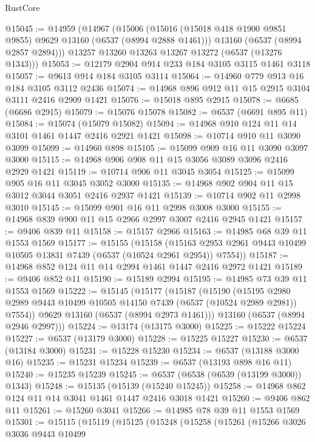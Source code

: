 \begin{lexlean}{RustCore}
\begin{coremodule}
@15045 := @14959
    (@14967
      (@15006
        (@15016 (@15018 @418 @1900 @9851 @9855) @9629 @13160 (@6537 (@8994 @2888 @1461)))
        @13160
        (@6537 (@8994 @2857 @2894)))
      @13257
      @13260
      @13263
      @13267
      @13272
      (@6537 (@13276 @1343)))
@15053 := @12179 @2904 @914 @233 @184 @3105 @3115 @1461 @3118
@15057 := @9613 @914 @184 @3105 @3114
@15064 := @14960 @779 @913 @16 @184 @3105 @3112 @2436
@15074 := @14968 @896 @912 @11 @15 @2915 @3104 @3111 @2416 @2909 @1421
@15076 := @15018 @895 @2915
@15078 := @6685 (@6686 @2915)
@15079 := @15076 @15078
@15082 := @6537 (@6691 @895 @11)
@15084 := @15074 (@15079 @15082)
@15094 := @14968 @910 @124 @11 @14 @3101 @1461 @1447 @2416 @2921 @1421
@15098 := @10714 @910 @11 @3090 @3099
@15099 := @14960 @898
@15105 := @15099 @909 @16 @11 @3090 @3097 @3000
@15115 := @14968 @906 @908 @11 @15 @3056 @3089 @3096 @2416 @2929 @1421
@15119 := @10714 @906 @11 @3045 @3054
@15125 := @15099 @905 @16 @11 @3045 @3052 @3000
@15135 := @14968 @902 @904 @11 @15 @3012 @3044 @3051 @2416 @2937 @1421
@15139 := @10714 @902 @11 @2998 @3010
@15145 := @15099 @901 @16 @11 @2998 @3008 @3000
@15155 := @14968 @839 @900 @11 @15 @2966 @2997 @3007 @2416 @2945 @1421
@15157 := @9406 @839 @11
@15158 := @15157 @2966
@15163 := @14985 @68 @39 @11 @1553 @1569
@15177 := @15155
    (@15158
      (@15163 @2953 @2961 @9443 @10499 @10505 @13831 @7439 (@6537 (@10524 @2961 @2954)) @7554))
@15187 := @14968 @852 @124 @11 @14 @2994 @1461 @1447 @2416 @2972 @1421
@15189 := @9406 @852 @11
@15190 := @15189 @2994
@15195 := @14985 @73 @39 @11 @1553 @1569
@15222 := @15145
    (@15177
      (@15187
        (@15190
          (@15195 @2980 @2989 @9443 @10499 @10505 @14150 @7439 (@6537 (@10524 @2989 @2981)) @7554))
        @9629
        @13160
        (@6537 (@8994 @2973 @1461)))
      @13160
      (@6537 (@8994 @2946 @2997)))
@15224 := @13174 (@13175 @3000)
@15225 := @15222 @15224
@15227 := @6537 (@13179 @3000)
@15228 := @15225 @15227
@15230 := @6537 (@13184 @3000)
@15231 := @15228 @15230
@15234 := @6537 (@13188 @3000 @16)
@15235 := @15231 @15234
@15239 := @6537 (@13193 @898 @16 @11)
@15240 := @15235 @15239
@15245 := @6537 (@6538 (@6539 (@13199 @3000)) @1343)
@15248 := @15135 (@15139 (@15240 @15245))
@15258 := @14968 @862 @124 @11 @14 @3041 @1461 @1447 @2416 @3018 @1421
@15260 := @9406 @862 @11
@15261 := @15260 @3041
@15266 := @14985 @78 @39 @11 @1553 @1569
@15301 := @15115
    (@15119
      (@15125
        (@15248
          (@15258
            (@15261
              (@15266
                @3026
                @3036
                @9443
                @10499

\end{coremodule}
\end{lexlean}
